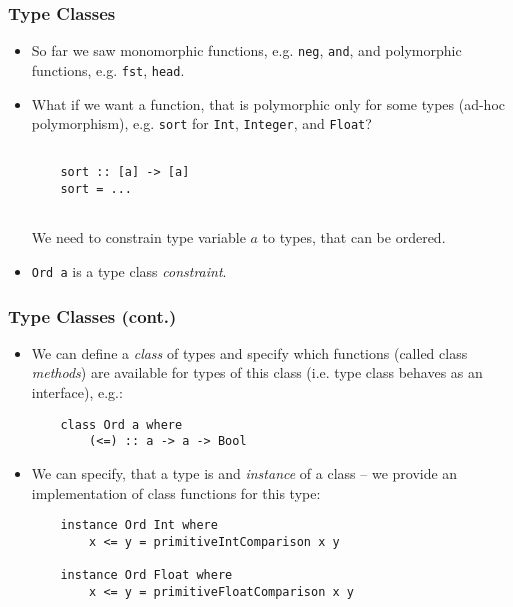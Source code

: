 \documentclass[final,handout]{beamer}
\begin{document}
\begin{frame}[fragile]
    \frametitle{Type Classes}

    \begin{itemize}
        \item So far we saw monomorphic functions, e.g. \texttt{neg},
            \texttt{and}, and polymorphic functions, e.g. \texttt{fst},
            \texttt{head}.

        \item<2-> What if we want a function, that is polymorphic only for some types
            (ad-hoc polymorphism), e.g. \texttt{sort} for \texttt{Int},
            \texttt{Integer}, and \texttt{Float}?
            
{\tt
    ~\\
~~~~sort ::  [a] -> [a] \\
~~~~sort = ...\\
    ~\\
}

            We need to constrain type variable $a$ to types, that can be
            ordered. 

        \item<4-> \texttt{Ord a} is a type class \emph{constraint}.


    \end{itemize}
\end{frame}

\begin{frame}[fragile]
    \frametitle{Type Classes (cont.)}

    \begin{itemize}
        \item We can define a \emph{class} of types and specify which functions
            (called class \emph{methods}) are
            available for types of this class (i.e. type class behaves as an
            interface), e.g.:

            \begin{lstlisting}
    class Ord a where
        (<=) :: a -> a -> Bool
            \end{lstlisting}

        \item<2-> We can specify, that a type is and \emph{instance} of a class --
            we provide an implementation of class functions for this type:

           \begin{lstlisting}
    instance Ord Int where
        x <= y = primitiveIntComparison x y

    instance Ord Float where
        x <= y = primitiveFloatComparison x y
           \end{lstlisting}

    \end{itemize}
\end{frame}
\end{document}
